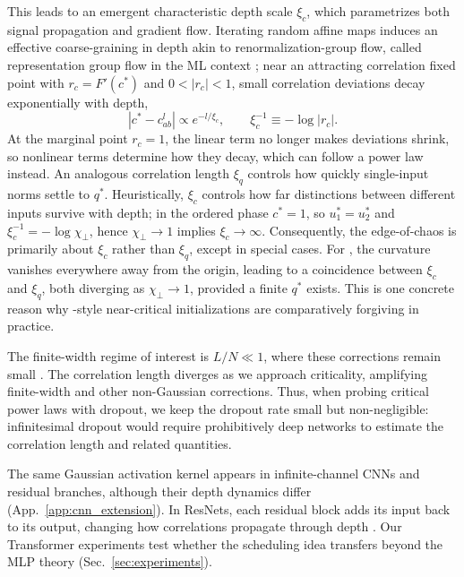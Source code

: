  This leads to an emergent characteristic depth scale $\xi_c$, which parametrizes both signal propagation and gradient flow. Iterating random affine maps induces an effective coarse-graining in depth akin to renormalization-group flow, called representation group flow in the ML context \cite{roberts2022principlesdeeplearningtheory}; near an attracting correlation fixed point with $r_c=F'(c^*)$ and $0<|r_c|<1$, small correlation deviations decay exponentially with depth,
\begin{equation}
|{c^*-c^l_{ab}}|\propto e^{-l/\xi_{c}}, \qquad \xi_{c}^{-1}\equiv -\log|r_{c}|.
\label{corrq}
\end{equation}
At the marginal point $r_c=1$, the linear term no longer makes deviations shrink, so nonlinear terms determine how they decay, which can follow a power law instead.
An analogous correlation length $\xi_q$ controls how quickly single-input norms settle to $q^{*}$. Heuristically, $\xi_{c}$ controls how far distinctions between different inputs survive with depth; in the ordered phase $c^{*}=1$, so $u_{1}^{*}=u_{2}^{*}$ and $\xi_{c}^{-1}=-\log\chi_{\perp}$, hence $\chi_{\perp}\to 1$ implies $\xi_{c}\to\infty$. Consequently, the edge-of-chaos is primarily about $\xi_{c}$ rather than $\xi_{q}$, except in special cases. For \relu{}, the curvature vanishes everywhere away from the origin, leading to a coincidence between $\xi_c$ and $\xi_q$, both diverging as $\chi_{\perp}\to 1$, provided a finite $q^{*}$ exists. This is one concrete reason why \relu{}-style near-critical initializations are comparatively forgiving in practice.

The finite-width regime of interest is \(L/N \ll 1\), where these corrections remain small \cite{roberts2022principlesdeeplearningtheory}. The correlation length diverges as we approach criticality, amplifying finite-width and other non-Gaussian corrections. Thus, when probing critical power laws with dropout, we keep the dropout rate small but non-negligible: infinitesimal dropout would require prohibitively deep networks to estimate the correlation length and related quantities.

The same Gaussian activation kernel appears in infinite-channel CNNs and residual branches, although their depth dynamics differ (App.~\ref{app:cnn_extension}). In ResNets, each residual block adds its input back to its output, changing how correlations propagate through depth \cite{yang2017meanfieldresnets}. Our Transformer experiments test whether the scheduling idea transfers beyond the MLP theory (Sec.~\ref{sec:experiments}).

